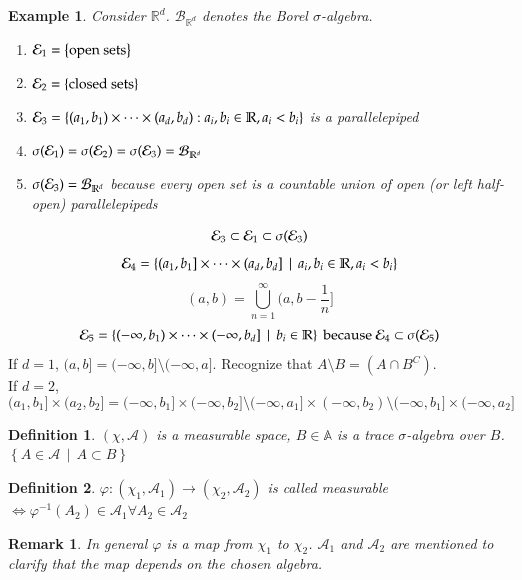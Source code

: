 \documentclass[a4paper]{article}
\numberwithin{lecref}{section}
\theoremstyle{break}
\newtheorem*{Example}{Example}
\newtheorem*{Definition}{Definition}
\newtheorem*{Remark}{Remark}
\newcommand{\Set}[1]{\left\{#1\right\}}
\newcommand{\SetDef}[2]{\left\{#1\,\mid\,#2\right\}}
\begin{document}
\begin{Example}
  Consider $\mathbb R^d$. $\mathcal B_{\mathbb R^d}$ denotes the Borel $\sigma$-algebra.
  \begin{enumerate}
    \item $\gen_1 = \Set{\text{open sets}}$
    \item $\gen_2 = \Set{\text{closed sets}}$
    \item $\gen_3 = \Set{(a_1, b_1) \times \dots \times (a_d, b_d): a_i, b_i \in \mathbb R, a_i < b_i}$ is a parallelepiped
    \item $\sigma({\mathcal E}_1) = \sigma({\mathcal E}_2) = \sigma({\mathcal E}_3) = \mathcal B_{\mathbb R^d}$
    \item $\sigma({\mathcal E}_3) = \mathcal B_{\mathbb R^d}$ because every open set is a countable union of open (or left half-open) parallelepipeds
  \end{enumerate}
\end{Example}
\[ {\mathcal E}_3 \subset {\mathcal E}_1 \subset \sigma({\mathcal E}_3) \]
\[ \gen_4 = \SetDef{(a_1, b_1] \times \dots \times (a_d, b_d]}{a_i, b_i \in \mathbb R, a_i < b_i} \]
\[ (a, b) = \bigcup_{n=1}^\infty (a, b - \frac1n] \]
\[ \gen_5 = \SetDef{(-\infty, b_1) \times \dots \times (-\infty, b_d]}{b_i \in \mathbb R} \text{ because } \gen_4 \subset \sigma(\gen_5) \]
If $d=1$, $(a, b] = (-\infty, b] \setminus (-\infty, a]$. Recognize that $A \setminus B = (A \cap B^C)$. \\
If $d=2$,
\[ (a_1, b_1] \times (a_2, b_2] = (-\infty, b_1] \times (-\infty, b_2] \setminus (-\infty, a_1] \times (-\infty, b_2) \setminus (-\infty, b_1] \times (-\infty, a_2] \]

\begin{Definition}
  $(\chi, \mathcal A)$ is a measurable space, $B \in \mathbb A$ is a trace $\sigma$-algebra over $B$. $\SetDef{A \in \mathcal A}{A \subset B}$
\end{Definition}

\begin{Definition}
  $\varphi: (\chi_1, \mathcal A_1) \to (\chi_2, \mathcal A_2)$ is called measurable
  $\iff \varphi^{-1}(A_2) \in \mathcal A_1 \forall A_2 \in \mathcal A_2$
\end{Definition}

\begin{Remark}
  In general $\varphi$ is a map from $\chi_1$ to $\chi_2$.
  $\mathcal A_1$ and $\mathcal A_2$ are mentioned to clarify that the map depends on the chosen algebra.
\end{Remark}
\end{document}
